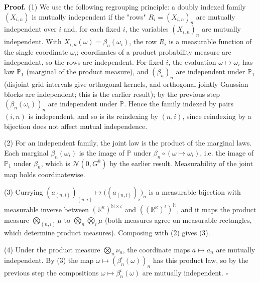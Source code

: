 \documentclass[11pt,a4paper]{article}
\begin{document}
\textbf{Proof.} (1) We use the following regrouping principle: a doubly indexed family \((X_{i,n})\) is mutually independent if the "rows" \(R_i=(X_{i,n})_{n}\) are mutually independent over \(i\) and, for each fixed \(i\), the variables \((X_{i,n})_n\) are mutually independent. With \(X_{i,n}(\omega)=\beta_n(\omega_i)\), the row \(R_i\) is a measurable function of the single coordinate \(\omega_i\); coordinates of a product probability measure are independent, so the rows are independent. For fixed \(i\), the evaluation \(\omega\mapsto\omega_i\) has law \(\mathbb P_1\) (marginal of the product measure), and \((\beta_n)_n\) are independent under \(\mathbb P_1\) (disjoint grid intervals give orthogonal kernels, and orthogonal jointly Gaussian blocks are independent; this is the earlier result); by the previous step \((\beta_n(\omega_i))_n\) are independent under \(\mathbb P\). Hence the family indexed by pairs \((i,n)\) is independent, and so is its reindexing by \((n,i)\), since reindexing by a bijection does not affect mutual independence.




(2) For an independent family, the joint law is the product of the marginal laws. Each marginal \(\beta_n(\omega_i)\) is the image of \(\mathbb P\) under \(\beta_n\circ(\omega\mapsto\omega_i)\), i.e. the image of \(\mathbb P_1\) under \(\beta_n\), which is \(\mathcal N(0,G^h)\) by the earlier result. Measurability of the joint map holds coordinatewise.




(3) Currying \((a_{(n,i)})_{(n,i)}\mapsto\bigl((a_{(n,i)})_{i}\bigr)_{n}\) is a measurable bijection with measurable inverse between \((\mathbb R^\kappa)^{\mathbb N\times\iota}\) and \(((\mathbb R^\kappa)^\iota)^{\mathbb N}\), and it maps the product measure \(\bigotimes_{(n,i)}\mu\) to \(\bigotimes_n\bigotimes_i\mu\) (both measures agree on measurable rectangles, which determine product measures). Composing with (2) gives (3).




(4) Under the product measure \(\bigotimes_n\nu_n\), the coordinate maps \(a\mapsto a_n\) are mutually independent. By (3) the map \(\omega\mapsto(\beta^\iota_n(\omega))_n\) has this product law, so by the previous step the compositions \(\omega\mapsto\beta^\iota_n(\omega)\) are mutually independent. \(\square\)
\end{document}

